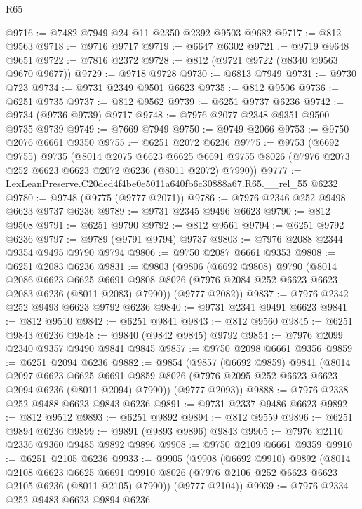 \begin{lexlean}{R65}
\begin{coremodule}
{@9716 := @7482 @7949 @24 @11 @2350 @2392 @9503 @9682
@9717 := @812 @9563
@9718 := @9716 @9717
@9719 := @6647 @6302
@9721 := @9719 @9648 @9651
@9722 := @7816 @2372
@9728 := @812 (@9721 @9722 (@8340 @9563 @9670 @9677))
@9729 := @9718 @9728
@9730 := @6813 @7949
@9731 := @9730 @723
@9734 := @9731 @2349 @9501 @6623
@9735 := @812 @9506
@9736 := @6251 @9735
@9737 := @812 @9562
@9739 := @6251 @9737 @6236
@9742 := @9734 (@9736 @9739) @9717
@9748 := @7976 @2077 @2348 @9351 @9500 @9735 @9739
@9749 := @7669 @7949
@9750 := @9749 @2066
@9753 := @9750 @2076 @6661 @9350
@9755 := @6251 @2072 @6236
@9775 := @9753
    (@6692 @9755)
    @9735
    (@8014
      @2075
      @6623
      @6625
      @6691
      @9755
      @8026
      (@7976 @2073 @252 @6623 @6623 @2072 @6236 (@8011 @2072) @7990))
@9777 := LexLeanPreserve.C20ded4f4be0e5011a640fb6c30888a67.R65.__rel_55 @6232
@9780 := @9748 (@9775 (@9777 @2071))
@9786 := @7976 @2346 @252 @9498 @6623 @9737 @6236
@9789 := @9731 @2345 @9496 @6623
@9790 := @812 @9508
@9791 := @6251 @9790
@9792 := @812 @9561
@9794 := @6251 @9792 @6236
@9797 := @9789 (@9791 @9794) @9737
@9803 := @7976 @2088 @2344 @9354 @9495 @9790 @9794
@9806 := @9750 @2087 @6661 @9353
@9808 := @6251 @2083 @6236
@9831 := @9803
    (@9806
      (@6692 @9808)
      @9790
      (@8014
        @2086
        @6623
        @6625
        @6691
        @9808
        @8026
        (@7976 @2084 @252 @6623 @6623 @2083 @6236 (@8011 @2083) @7990))
      (@9777 @2082))
@9837 := @7976 @2342 @252 @9493 @6623 @9792 @6236
@9840 := @9731 @2341 @9491 @6623
@9841 := @812 @9510
@9842 := @6251 @9841
@9843 := @812 @9560
@9845 := @6251 @9843 @6236
@9848 := @9840 (@9842 @9845) @9792
@9854 := @7976 @2099 @2340 @9357 @9490 @9841 @9845
@9857 := @9750 @2098 @6661 @9356
@9859 := @6251 @2094 @6236
@9882 := @9854
    (@9857
      (@6692 @9859)
      @9841
      (@8014
        @2097
        @6623
        @6625
        @6691
        @9859
        @8026
        (@7976 @2095 @252 @6623 @6623 @2094 @6236 (@8011 @2094) @7990))
      (@9777 @2093))
@9888 := @7976 @2338 @252 @9488 @6623 @9843 @6236
@9891 := @9731 @2337 @9486 @6623
@9892 := @812 @9512
@9893 := @6251 @9892
@9894 := @812 @9559
@9896 := @6251 @9894 @6236
@9899 := @9891 (@9893 @9896) @9843
@9905 := @7976 @2110 @2336 @9360 @9485 @9892 @9896
@9908 := @9750 @2109 @6661 @9359
@9910 := @6251 @2105 @6236
@9933 := @9905
    (@9908
      (@6692 @9910)
      @9892
      (@8014
        @2108
        @6623
        @6625
        @6691
        @9910
        @8026
        (@7976 @2106 @252 @6623 @6623 @2105 @6236 (@8011 @2105) @7990))
      (@9777 @2104))
@9939 := @7976 @2334 @252 @9483 @6623 @9894 @6236
}
\end{coremodule}
\end{lexlean}
